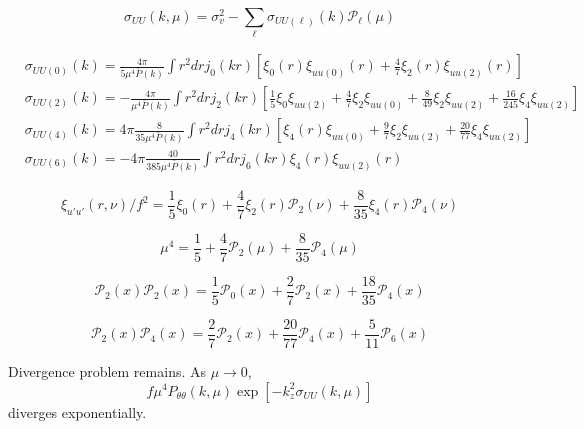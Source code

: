 \documentclass[a4paper,11pt, fleqn]{article}
\begin{document}
\begin{equation}
  \sigma_{UU}(k, \mu) = \sigma_v^2 - \sum_{\ell} \sigma_{UU(\ell)}(k) \mathcal{P}_\ell(\mu)
\end{equation}

\begin{align}
  &\sigma_{UU(0)}(k) = \frac{4\pi}{5 \mu^4 \bar{P}(k)}
    \int \! r^2 dr j_0(kr) \left[
    \xi_0(r) \xi_{uu(0)}(r) + \frac{4}{7} \xi_2(r) \xi_{uu(2)}(r) \right]\\
  &\sigma_{UU(2)}(k) = -\frac{4\pi}{\mu^4 \bar{P}(k)}
    \int \! r^2 dr j_2(kr) \left[
    \frac{1}{5} \xi_0 \xi_{uu(2)}
    +\frac{4}{7} \xi_2 \xi_{uu(0)}
    +\frac{8}{49} \xi_2 \xi_{uu(2)}
    + \frac{16}{245} \xi_4 \xi_{uu(2)}\right]\\
  &\sigma_{UU(4)}(k) = 4\pi \frac{8}{35 \mu^4 \bar{P}(k)}
    \int\! r^2 dr j_4(kr)\left[
      \xi_4(r)\xi_{uu(0)}
      + \frac{9}{7} \xi_2 \xi_{uu(2)}
      + \frac{20}{77} \xi_4 \xi_{uu(2)}
    \right]\\
  &\sigma_{UU(6)}(k) = -4\pi \frac{40}{385\mu^4 \bar{P}(k)}
    \int\! r^2 dr j_6(kr) \xi_4(r) \xi_{uu(2)}(r)
\end{align}

\begin{equation}
  \xi_{u'u'}(r, \nu)/f^2 = \frac{1}{5} \xi_0(r)
  + \frac{4}{7} \xi_2(r) \mathcal{P}_2(\nu)
  + \frac{8}{35} \xi_4(r) \mathcal{P}_4(\nu)
\end{equation}

\begin{equation}
  \mu^4 = \frac{1}{5} + \frac{4}{7} \mathcal{P}_2(\mu)
          + \frac{8}{35} \mathcal{P}_4(\mu)
\end{equation}

\begin{equation}
  \mathcal{P}_2(x) \mathcal{P}_2(x)
  = \frac{1}{5} \mathcal{P}_0(x) + \frac{2}{7} \mathcal{P}_2(x)
    + \frac{18}{35} \mathcal{P}_4(x)
\end{equation}

\begin{equation}
  \mathcal{P}_2(x) \mathcal{P}_4(x)
  = \frac{2}{7} \mathcal{P}_2(x)
  + \frac{20}{77} \mathcal{P}_4(x)
  + \frac{5}{11} \mathcal{P}_6(x)
\end{equation}

Divergence problem remains. As $\mu \rightarrow 0$,
\begin{equation}
  f\mu^4 P_{\theta\theta}(k, \mu) \exp [ - k_z^2 \sigma_{UU}(k, \mu) ]
\end{equation}
diverges exponentially.
\end{document}
